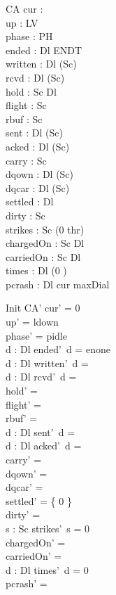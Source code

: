 \documentclass[a4paper,10pt,fleqn]{article}
\begin{document}
\begin{schema}{CA}
  cur : \nat \\
  up : LV \\
  phase : PH \\
  ended : Dl \fun ENDT \\
  written : Dl \fun (\power Sc) \\
  rcvd : Dl \fun (\power Sc) \\
  hold : Sc \pfun Dl \\
  flight : \power Sc \\
  rbuf : \power Sc \\
  sent : Dl \fun (\power Sc) \\
  acked : Dl \fun (\power Sc) \\
  carry : \power Sc \\
  dqown : Dl \pfun (\power Sc) \\
  dqcar : Dl \pfun (\power Sc) \\
  settled : \power Dl \\
  dirty : \power Sc \\
  strikes : Sc \fun (0 \upto thr) \\
  chargedOn : Sc \rel Dl \\
  carriedOn : Sc \rel Dl \\
  times : Dl \fun (0 ) \\
  pcrash : \power Dl
\where
  cur \leq maxDial
\end{schema}

\begin{schema}{Init}
  CA'
\where
  cur' = 0 \\
  up' = ldown \\
  phase' = pidle \\
  \forall d : Dl \spot ended'~d = enone \\
  \forall d : Dl \spot written'~d = \emptyset \\
  \forall d : Dl \spot rcvd'~d = \emptyset \\
  hold' = \emptyset \\
  flight' = \emptyset \\
  rbuf' = \emptyset \\
  \forall d : Dl \spot sent'~d = \emptyset \\
  \forall d : Dl \spot acked'~d = \emptyset \\
  carry' = \emptyset \\
  dqown' = \emptyset \\
  dqcar' = \emptyset \\
  settled' = \{ 0 \} \\
  dirty' = \emptyset \\
  \forall s : Sc \spot strikes'~s = 0 \\
  chargedOn' = \emptyset \\
  carriedOn' = \emptyset \\
  \forall d : Dl \spot times'~d = 0 \\
  pcrash' = \emptyset
\end{schema}
\end{document}
